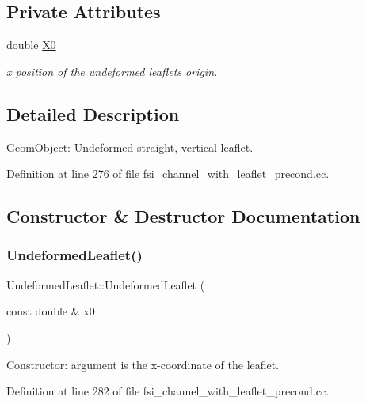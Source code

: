 \subsection*{Private Attributes}
\begin{DoxyCompactItemize}
\item 
double \hyperlink{classUndeformedLeaflet_aa89fc695af9e53aa38894c9d875afd36}{X0}
\begin{DoxyCompactList}\small\item\em x position of the undeformed leaflet\textquotesingle{}s origin. \end{DoxyCompactList}\end{DoxyCompactItemize}


\subsection{Detailed Description}
Geom\+Object\+: Undeformed straight, vertical leaflet. 

Definition at line 276 of file fsi\+\_\+channel\+\_\+with\+\_\+leaflet\+\_\+precond.\+cc.



\subsection{Constructor \& Destructor Documentation}
\mbox{\label{classUndeformedLeaflet_ac4c0478b1f329360684af14b59043b12}} 
\subsubsection{\texorpdfstring{Undeformed\+Leaflet()}{UndeformedLeaflet()}}
{\footnotesize\ttfamily Undeformed\+Leaflet\+::\+Undeformed\+Leaflet (\begin{DoxyParamCaption}\item[{const double \&}]{x0 }\end{DoxyParamCaption})\hspace{0.3cm}{\ttfamily [inline]}}



Constructor\+: argument is the x-\/coordinate of the leaflet. 



Definition at line 282 of file fsi\+\_\+channel\+\_\+with\+\_\+leaflet\+\_\+precond.\+cc.



